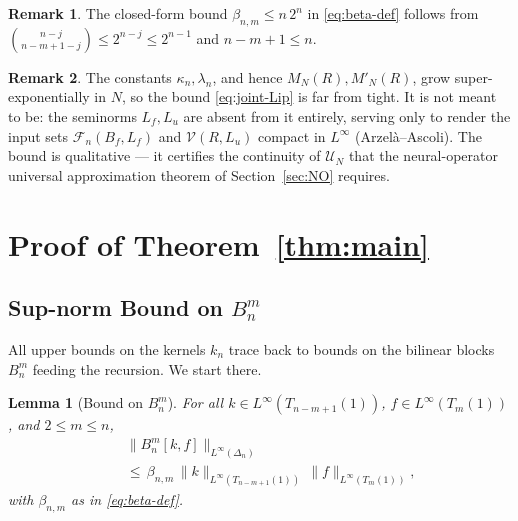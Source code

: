\documentclass[twocolumn,amsthm]{autart}
\newcommand{\Linf}{L^\infty}
\theoremstyle{plain}
\newtheorem{lemma}{Lemma}
\theoremstyle{definition}
\newtheorem{remark}{Remark}
\begin{document}
\begin{remark}
\label{rem:beta-bound}
The closed-form bound $\beta_{n,m}\le n\,2^n$ in \eqref{eq:beta-def} follows from $\binom{n-j}{n-m+1-j}\le 2^{n-j}\le 2^{n-1}$ and $n-m+1\le n$.
\end{remark}

\begin{remark}
\label{rem:kappa-growth}
The constants $\kappa_n, \lambda_n$, and hence $M_N(R), M'_N(R)$, grow super-exponentially in $N$, so the bound \eqref{eq:joint-Lip} is far from tight. It is not meant to be: the seminorms $L_f, L_u$ are absent from it entirely, serving only to render the input sets $\mathcal{F}_n(B_f,L_f)$ and $\mathcal{V}(R,L_u)$ compact in $\Linf$ (Arzel\`a--Ascoli). The bound is qualitative --- it certifies the continuity of $\mathcal{U}_N$ that the neural-operator universal approximation theorem of Section~\ref{sec:NO} requires.
\end{remark}

\section{Proof of Theorem~\ref{thm:main}}
\label{sec:proof-thm1}

\subsection{Sup-norm Bound on $B_n^m$}
\label{sec:Bbound}

All upper bounds on the kernels $k_n$ trace back to bounds on the bilinear blocks $B_n^m$ feeding the recursion. We start there.

\begin{lemma}[Bound on $B_n^m$]
\label{lem:Bbound}
For all $k\in\Linf(T_{n-m+1}(1))$, $f\in\Linf(T_m(1))$, and $2\le m\le n$,
\begin{eqnarray}
&& \|B_n^m[k,f]\|_{\Linf(\Delta_n)} \nonumber \\
&& \le\, \beta_{n,m}\,\|k\|_{\Linf(T_{n-m+1}(1))}\,\|f\|_{\Linf(T_m(1))},
\label{eq:Bbound}
\end{eqnarray}
with $\beta_{n,m}$ as in \eqref{eq:beta-def}.
\end{lemma}
\end{document}

